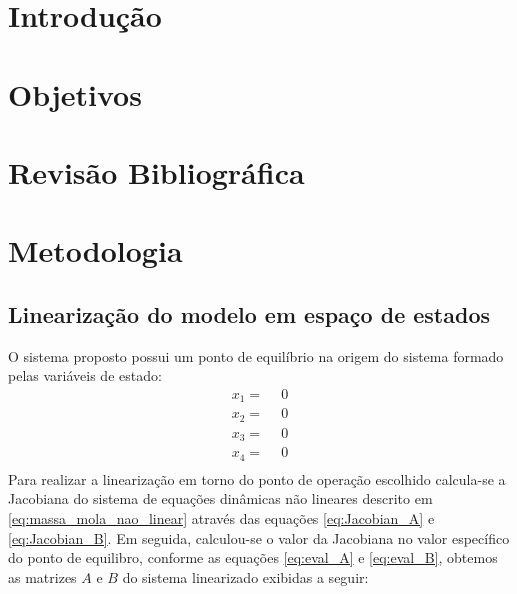 \documentclass[a4paper]{ifacconf}
\begin{document}
    \section{Introdução}
        
    \section{Objetivos}
        
    \section{Revisão Bibliográfica}
        
    \section{Metodologia}
        \subsection{Linearização do modelo em espaço de estados}
        
    O sistema proposto possui um ponto de equilíbrio na origem do sistema formado pelas variáveis de estado:
    \begin{equation*}
        \begin{split}
        x_1=\ \ &0\\
        x_2=\ \ &0\\
        x_3=\ \ &0\\
        x_4=\ \ &0\\
        \end{split}
    \end{equation*}
    Para realizar a linearização em torno do ponto de operação escolhido calcula-se a Jacobiana do sistema de equações dinâmicas não lineares descrito em \ref{eq:massa_mola_nao_linear} através das equações \ref{eq:Jacobian_A} e \ref{eq:Jacobian_B}. Em seguida, calculou-se o valor da Jacobiana no valor específico do ponto de equilibro, conforme as equações \ref{eq:eval_A} e \ref{eq:eval_B}, obtemos as matrizes $A$ e $B$ do sistema linearizado exibidas a seguir:
 
\end{document}
